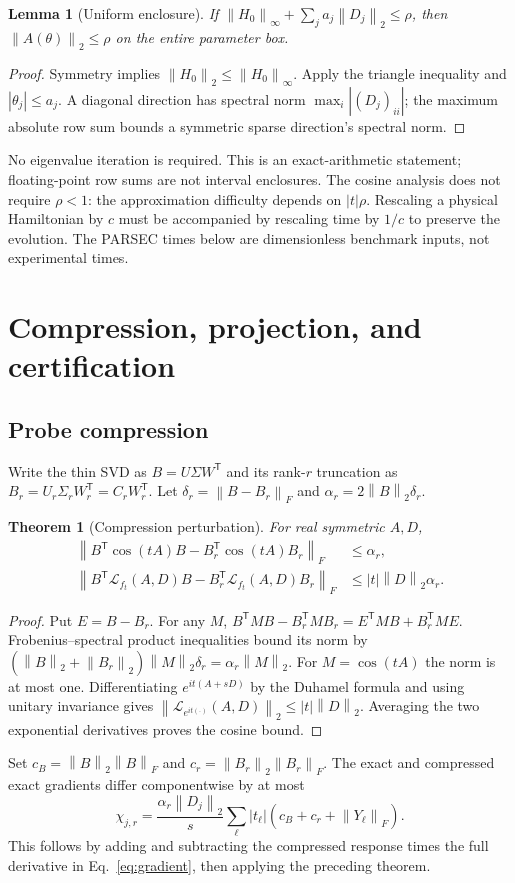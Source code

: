 \documentclass[10pt,letterpaper,twoside]{article}
\newcommand{\norm}[1]{\left\lVert #1\right\rVert}
\newcommand{\Lfrechet}{\mathcal{L}}
\newtheorem{theorem}{Theorem}
\newtheorem{lemma}{Lemma}
\begin{document}
\begin{lemma}[Uniform enclosure]
If $\norm{H_0}_\infty+\sum_j a_j\norm{D_j}_2\le\rho$, then
$\norm{A(\theta)}_2\le\rho$ on the entire parameter box.
\end{lemma}
\begin{proof}
Symmetry implies $\norm{H_0}_2\le\norm{H_0}_\infty$. Apply the triangle
inequality and $|\theta_j|\le a_j$. A diagonal direction has spectral norm
$\max_i|(D_j)_{ii}|$; the maximum absolute row sum bounds a symmetric sparse
direction's spectral norm.
\end{proof}
No eigenvalue iteration is required. This is an exact-arithmetic statement;
floating-point row sums are not interval enclosures. The cosine analysis does
not require $\rho<1$: the approximation difficulty depends on $|t|\rho$.
Rescaling a physical Hamiltonian by $c$ must be accompanied by rescaling time
by $1/c$ to preserve the evolution. The PARSEC times below are dimensionless
benchmark inputs, not experimental times.

\section{Compression, projection, and certification}
\subsection{Probe compression}
Write the thin SVD as $B=U\Sigma W^{\mathsf T}$ and its rank-$r$ truncation
as $B_r=U_r\Sigma_rW_r^{\mathsf T}=C_rW_r^{\mathsf T}$. Let
$\delta_r=\norm{B-B_r}_F$ and $\alpha_r=2\norm B_2\delta_r$.
\begin{theorem}[Compression perturbation]
For real symmetric $A,D$,
\begin{align}
 \norm{B^{\mathsf T}\cos(tA)B-B_r^{\mathsf T}\cos(tA)B_r}_F&\le\alpha_r,\\
 \norm{B^{\mathsf T}\Lfrechet_{f_t}(A,D)B-B_r^{\mathsf T}\Lfrechet_{f_t}(A,D)B_r}_F
 &\le |t|\norm D_2\alpha_r.
\end{align}
\end{theorem}
\begin{proof}
Put $E=B-B_r$. For any $M$,
$B^{\mathsf T}MB-B_r^{\mathsf T}MB_r=E^{\mathsf T}MB+B_r^{\mathsf T}ME$.
Frobenius--spectral product inequalities bound its norm by
$(\norm B_2+\norm{B_r}_2)\norm M_2\delta_r=\alpha_r\norm M_2$.
For $M=\cos(tA)$ the norm is at most one. Differentiating $e^{it(A+sD)}$
by the Duhamel formula and using unitary invariance gives
$\norm{\Lfrechet_{e^{it(\cdot)}}(A,D)}_2\le|t|\norm D_2$.
Averaging the two exponential derivatives proves the cosine bound.
\end{proof}
Set $c_B=\norm B_2\norm B_F$ and $c_r=\norm{B_r}_2\norm{B_r}_F$.
The exact and compressed exact gradients differ componentwise by at most
\begin{equation}
 \chi_{j,r}=\frac{\alpha_r\norm{D_j}_2}{s}
 \sum_\ell |t_\ell|(c_B+c_r+\norm{Y_\ell}_F).
 \label{eq:chi}
\end{equation}
This follows by adding and subtracting the compressed response times the full
derivative in Eq.~\eqref{eq:gradient}, then applying the preceding theorem.
\end{document}
